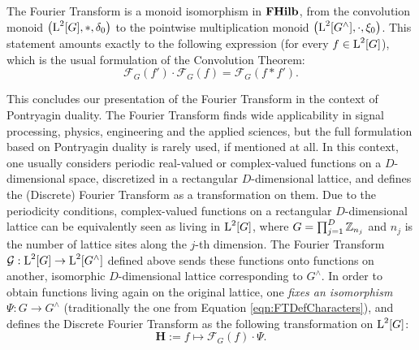 \begin{theorem}
The Fourier Transform is a monoid isomorphism in $\mathbf{FHilb}$, from the convolution monoid $\left( \operatorname{L}^2[G],*,\delta_0 \right)$ to the pointwise multiplication monoid $\left( \operatorname{L}^2[G^\wedge],\cdot, \xi_0 \right)$. This statement amounts exactly to the following expression (for every $f\in \operatorname{L}^2[G]$), which is the usual formulation of the Convolution Theorem: 
\begin{equation}\label{eqn:ConvolutionTheorem}
  \mathcal{F}_G (f') \cdot \mathcal{F}_G (f) = \mathcal{F}_G (f * f').
\end{equation}
\end{theorem}

This concludes our presentation of the Fourier Transform in the context of Pontryagin duality. The Fourier Transform finds wide applicability in signal processing, physics, engineering and the applied sciences, but the full formulation based on Pontryagin duality is rarely used, if mentioned at all. In this context, one usually considers periodic real-valued or complex-valued functions on a $D$-dimensional space, discretized in a rectangular $D$-dimensional lattice, and defines the (Discrete) Fourier Transform as a transformation on them. Due to the periodicity conditions, complex-valued functions on a rectangular $D$-dimensional lattice can be equivalently seen as living in $\operatorname{L}^2[G]$, where $G = \prod_{j=1}^D \mathbb{Z}_{n_j}$ and $n_j$ is the number of lattice sites along the $j$-th dimension. The  Fourier Transform $\mathcal{G} : \operatorname{L}^2[G] \rightarrow \operatorname{L}^2[G^\wedge]$ defined above sends these functions onto functions on another, isomorphic $D$-dimensional lattice corresponding to $G^\wedge$. In order to obtain functions living again on the original lattice, one \emph{fixes an isomorphism} $\Psi : G \rightarrow G^\wedge$ (traditionally the one from Equation \ref{eqn:FTDefCharacters}), and defines the Discrete Fourier Transform as the following transformation on $\operatorname{L}^2[G]$:
\begin{equation}\label{eqn:FTDefDFT}
  \mathbf{H} := f \mapsto \mathcal{F}_G(f) \cdot \Psi.
\end{equation}

